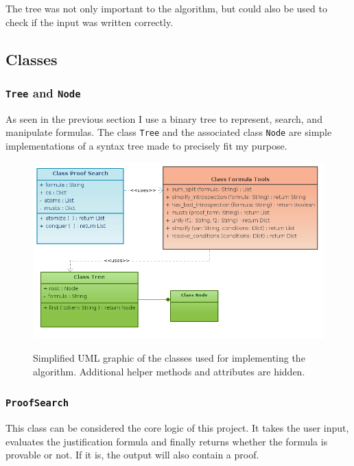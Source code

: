 The tree was not only important to the algorithm, but could also be used to check if the input was written correctly.

\subsection{Classes}

\subsubsection[Tree and Node]{\texttt{Tree} and \texttt{Node}}
As seen in the previous section I use a binary tree to represent, search, and manipulate formulas. The class \texttt{Tree} and the associated class \texttt{Node} are simple implementations of a syntax tree made to precisely fit my purpose. 

\begin{figure}[H]
	\caption{Simplified UML graphic of the classes used for implementing the algorithm. Additional helper methods and attributes are hidden.}
	\includegraphics[width=1\textwidth]{Figures/uml_j-logic.png}
	\label{uml}
\end{figure}


\subsubsection[ProofSearch]{\texttt{ProofSearch}}
This class can be considered the core logic of this project. It takes the user input, evaluates the justification formula and finally returns whether the formula is provable or not. If it is, the output will also contain a proof.

